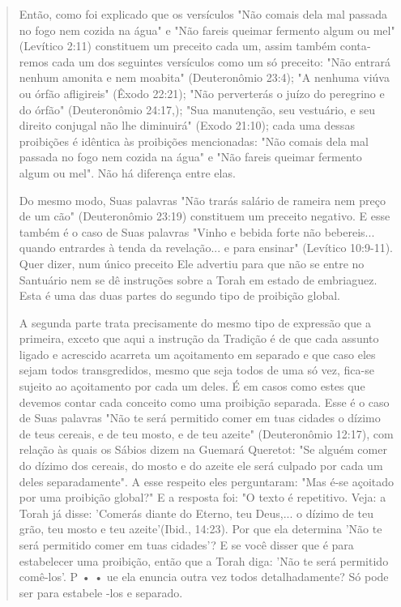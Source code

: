 \begin{quote}
Então, como foi explicado que os versículos "Não comais dela mal passada
no fogo nem cozida na água" e "Não fareis queimar fermento algum ou mel"
(Levítico 2:11) constituem um preceito cada um, assim também conta­remos
cada um dos seguintes versículos como um só preceito: "Não entrará
nenhum amonita e nem moabita" (Deuteronômio 23:4); "A nenhuma viúva ou
órfão afligireis" (Êxodo 22:21); "Não perverterás o juízo do peregrino e
do ór­fão" (Deuteronômio 24:17,); "Sua manutenção, seu vestuário, e seu
direito con­jugal não lhe diminuirá" (Exodo 21:10); cada uma dessas
proibições é idêntica às proibições mencionadas: "Não comais dela mal
passada no fogo nem cozida na água" e "Não fareis queimar fermento algum
ou mel". Não há diferença en­tre elas.

Do mesmo modo, Suas palavras "Não trarás salário de rameira nem preço de
um cão" (Deuteronômio 23:19) constituem um preceito negativo. E esse
também é o caso de Suas palavras "Vinho e bebida forte não bebereis...
quando entrardes à tenda da revelação... e para ensinar" (Levítico
10:9-11). Quer dizer, num único preceito Ele advertiu para que não se
entre no Santuário nem se dê instruções sobre a Torah em estado de
embriaguez. Esta é uma das duas partes do segundo tipo de proibição
global.

A segunda parte trata precisamente do mesmo tipo de expressão que a
primeira, exceto que aqui a instrução da Tradição é de que cada assunto
liga­do e acrescido acarreta um açoitamento em separado e que caso eles
sejam to­dos transgredidos, mesmo que seja todos de uma só vez, fica-se
sujeito ao açoi­tamento por cada um deles. É em casos como estes que
devemos contar cada conceito como uma proibição separada.
Esse é o caso de Suas palavras "Não te será permitido comer em tuas
cidades o dízimo de teus cereais, e de teu mosto, e de teu azeite"
(Deuteronô­mio 12:17), com relação às quais os Sábios dizem na Guemará
Queretot: "Se al­guém comer do dízimo dos cereais, do mosto e do azeite
ele será culpado por cada um deles separadamente". A esse respeito eles
perguntaram: "Mas é-se açoi­tado por uma proibição global?" E a resposta
foi: "O texto é repetitivo. Veja: a Torah já disse: 'Comerás diante do
Eterno, teu Deus,... o dízimo de teu grão, teu mosto e teu
azeite'(Ibid., 14:23). Por que ela determina 'Não te será permiti­do
comer em tuas cidades'? E se você disser que é para estabelecer uma
proibi­ção, então que a Torah diga: 'Não te será permitido comê-los'. P
• • ue ela enun­cia outra vez todos detalhadamente? Só pode ser para
estabele -los e separado.


\end{quote}

